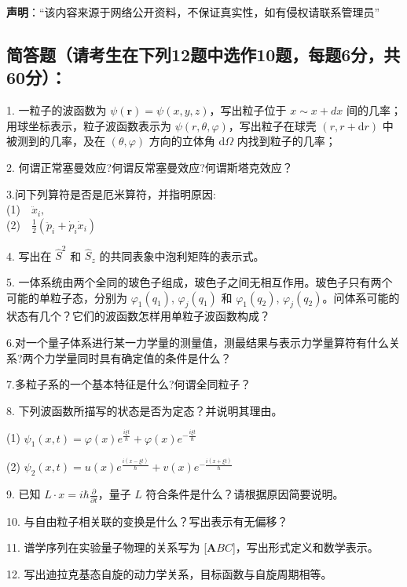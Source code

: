 
\textbf{声明}：“该内容来源于网络公开资料，不保证真实性，如有侵权请联系管理员”

\subsection{简答题（请考生在下列12题中选作10题，每题6分，共60分）：}

1. 一粒子的波函数为 $\psi (\mathbf{r}) = \psi (x, y, z)$，写出粒子位于 $x \sim x + d x$ 间的几率；用球坐标表示，粒子波函数表示为 $\psi (r, \theta, \varphi)$，写出粒子在球壳 $(r, r + \mathrm{d}r)$ 中被测到的几率，及在 $(\theta, \varphi)$ 方向的立体角 $\mathrm{d}\Omega$ 内找到粒子的几率；

2. 何谓正常塞曼效应?何谓反常塞曼效应?何谓斯塔克效应？

3.问下列算符是否是厄米算符，并指明原因:\\
(1)$\quad \ddot{x}_i,$\\ (2)$\quad \frac{1}{2}(\ddot{p}_i + \dot{p}_i \dot{x}_i)$

4. 写出在 $\hat{S}^2$ 和 $\hat{S}_z$ 的共同表象中泡利矩阵的表示式。

5. 一体系统由两个全同的玻色子组成，玻色子之间无相互作用。玻色子只有两个可能的单粒子态，分别为 $\varphi_1(q_1)$, $\varphi_j(q_1)$ 和 $\varphi_1(q_2)$, $\varphi_j(q_2)$。问体系可能的状态有几个？它们的波函数怎样用单粒子波函数构成？

6.对一个量子体系进行某一力学量的测量值，测最结果与表示力学量算符有什么关系?两个力学量同时具有确定值的条件是什么？

7.多粒子系的一个基本特征是什么?何谓全同粒子？

8. 下列波函数所描写的状态是否为定态？并说明其理由。

 (1) $\psi_1(x,t) = \varphi(x) e^{\frac{i \xi t}{\hbar}} + \varphi(x) e^{-\frac{i \xi t}{\hbar}}$

 (2) $\psi_2(x,t) = u(x) e^{\frac{i (x - \xi t)}{\hbar}} + v(x) e^{-\frac{i (x + \xi t)}{\hbar}}$

9. 已知 $L \cdot x = i \hbar \frac{\partial}{\partial t}$，量子 $L$ 符合条件是什么？请根据原因简要说明。

10. 与自由粒子相关联的变换是什么？写出表示有无偏移？

11. 谱学序列在实验量子物理的关系写为 [$\textbf{A} \textit{B} \textit{C}$]，写出形式定义和数学表示。

12. 写出迪拉克基态自旋的动力学关系，目标函数与自旋周期相等。
